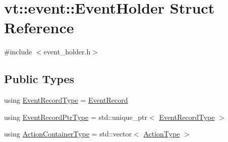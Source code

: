 \hypertarget{structvt_1_1event_1_1_event_holder}{}\section{vt\+:\+:event\+:\+:Event\+Holder Struct Reference}
\label{structvt_1_1event_1_1_event_holder}


{\ttfamily \#include $<$event\+\_\+holder.\+h$>$}

\subsection*{Public Types}
\begin{DoxyCompactItemize}
\item 
using \hyperlink{structvt_1_1event_1_1_event_holder_adfdec23d67b016b1f028694d5ca5bcff}{Event\+Record\+Type} = \hyperlink{structvt_1_1event_1_1_event_record}{Event\+Record}
\item 
using \hyperlink{structvt_1_1event_1_1_event_holder_a89949c85549018aad229356105187d50}{Event\+Record\+Ptr\+Type} = std\+::unique\+\_\+ptr$<$ \hyperlink{structvt_1_1event_1_1_event_holder_adfdec23d67b016b1f028694d5ca5bcff}{Event\+Record\+Type} $>$
\item 
using \hyperlink{structvt_1_1event_1_1_event_holder_ae0e2d5fe3bd5792118116105a0a09db7}{Action\+Container\+Type} = std\+::vector$<$ \hyperlink{namespacevt_ae0a5a7b18cc99d7b732cb4d44f46b0f3}{Action\+Type} $>$
\end{DoxyCompactItemize}

